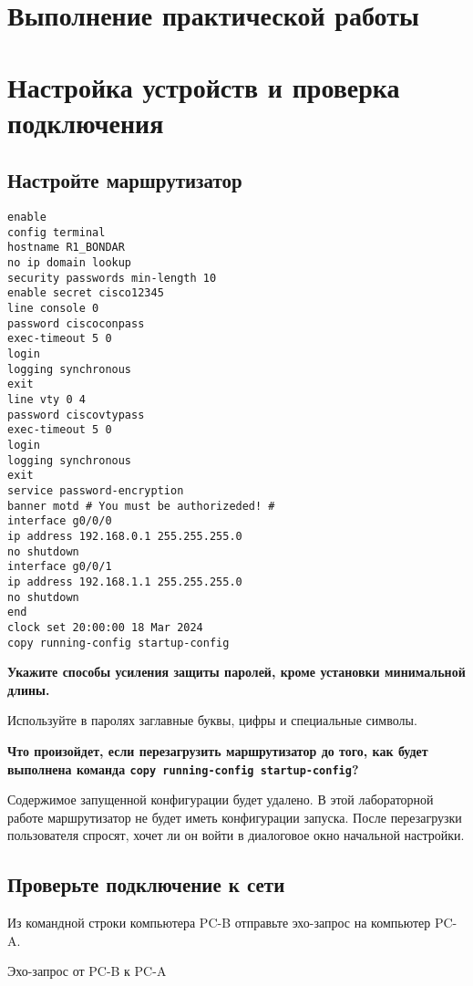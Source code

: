 \section{Выполнение практической работы}

\section{Настройка устройств и проверка подключения}

\subsection{Настройте маршрутизатор}

\begin{verbatim}
enable
config terminal
hostname R1_BONDAR
no ip domain lookup
security passwords min-length 10
enable secret cisco12345
line console 0
password ciscoconpass
exec-timeout 5 0
login
logging synchronous
exit
line vty 0 4
password ciscovtypass
exec-timeout 5 0
login
logging synchronous
exit
service password-encryption
banner motd # You must be authorizeded! #
interface g0/0/0
ip address 192.168.0.1 255.255.255.0
no shutdown
interface g0/0/1
ip address 192.168.1.1 255.255.255.0
no shutdown
end
clock set 20:00:00 18 Mar 2024
copy running-config startup-config
\end{verbatim}

\textbf{Укажите способы усиления защиты паролей,
кроме установки минимальной длины.}

Используйте в паролях заглавные буквы, цифры и специальные символы.

\textbf{Что произойдет, если перезагрузить маршрутизатор до того,
как будет выполнена команда \texttt{copy running-config startup-config}?}

Содержимое запущенной конфигурации будет удалено.
В этой лабораторной работе маршрутизатор не будет иметь конфигурации запуска.
После перезагрузки пользователя спросят,
хочет ли он войти в диалоговое окно начальной настройки.

\subsection{Проверьте подключение к сети}

Из командной строки компьютера PC-B отправьте эхо-запрос на компьютер PC-A.

\begin{image}
	\caption{Эхо-запрос от PC-B к PC-A}
\end{image}


